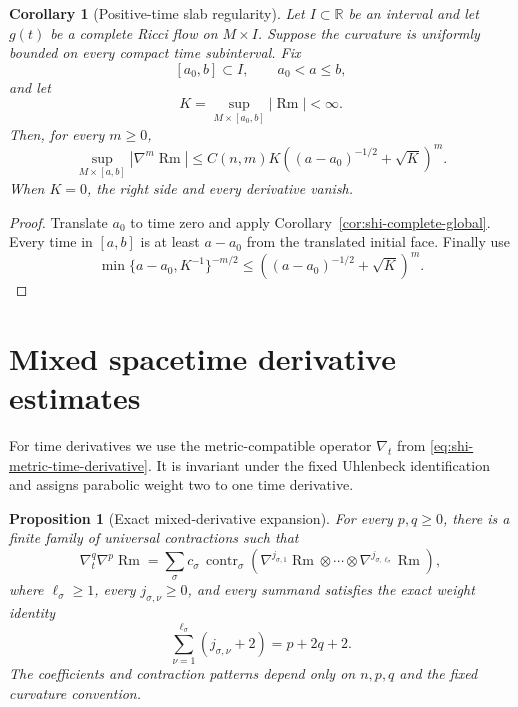 \documentclass[10pt]{coll-l}
\newtheorem{corollary}[theorem]{Corollary}
\newtheorem{proposition}[theorem]{Proposition}
\theoremstyle{definition}
\theoremstyle{remark}
\numberwithin{section}{chapter}
\numberwithin{equation}{chapter}
\newcommand{\Rm}{\operatorname{Rm}}
\begin{document}
\begin{corollary}[Positive-time slab regularity]
\label{cor:shi-positive-slab}
Let $I\subset\mathbb R$ be an interval and let $g(t)$ be a complete Ricci
flow on $M\times I$.  Suppose the curvature is uniformly bounded on every
compact time subinterval.  Fix
\[
                  [a_0,b]\subset I,
                  \qquad a_0<a\leq b,
\]
and let
\[
                  K=\sup_{M\times[a_0,b]}|\Rm|<\infty.
\]
Then, for every $m\geq0$,
\begin{equation}
 \sup_{M\times[a,b]}|\nabla^m\Rm|
   \leq C(n,m)K
      \left((a-a_0)^{-1/2}+\sqrt K\right)^m.             \label{eq:shi-positive-slab}
\end{equation}
When $K=0$, the right side and every derivative vanish.
\end{corollary}

\begin{proof}
Translate $a_0$ to time zero and apply
Corollary~\ref{cor:shi-complete-global}.  Every time in $[a,b]$ is at least
$a-a_0$ from the translated initial face.  Finally use
\[
 \min\{a-a_0,K^{-1}\}^{-m/2}
   \leq\left((a-a_0)^{-1/2}+\sqrt K\right)^m.
\]
\end{proof}

\section{Mixed spacetime derivative estimates}
\label{sec:shi-mixed}

For time derivatives we use the metric-compatible operator $\nabla_t$ from
\eqref{eq:shi-metric-time-derivative}.  It is invariant under the fixed
Uhlenbeck identification and assigns parabolic weight two to one time
derivative.

\begin{proposition}[Exact mixed-derivative expansion]
\label{prop:shi-mixed-derivatives}
For every $p,q\geq0$, there is a finite family of universal contractions
such that
\begin{equation}
 \nabla_t^q\nabla^p\Rm
   =\sum_\sigma c_\sigma\,
       \operatorname{contr}_\sigma
       \left(
          \nabla^{j_{\sigma,1}}\Rm\otimes\cdots\otimes
          \nabla^{j_{\sigma,\ell_\sigma}}\Rm
       \right),                                         \label{eq:shi-mixed-expansion}
\end{equation}
where $\ell_\sigma\geq1$, every $j_{\sigma,\nu}\geq0$, and every summand
satisfies the exact weight identity
\begin{equation}
       \sum_{\nu=1}^{\ell_\sigma}(j_{\sigma,\nu}+2)
             =p+2q+2.                                   \label{eq:shi-mixed-weight}
\end{equation}
The coefficients and contraction patterns depend only on $n,p,q$ and the
fixed curvature convention.
\end{proposition}
\end{document}
